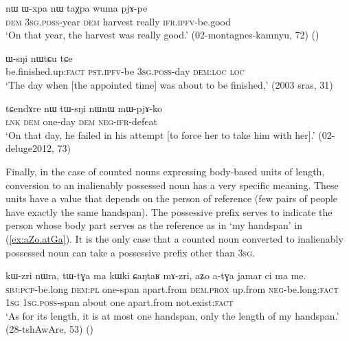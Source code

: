 \begin{exe}
\ex \label{ex:nW.Wxpa.nW}
\gll nɯ ɯ-xpa nɯ taχpa wuma pjɤ-pe \\
\textsc{dem} \textsc{3sg}.\textsc{poss}-year \textsc{dem} harvest really \textsc{ifr}.\textsc{ipfv}-be.good \\
\glt `On that year, the harvest was really good.' (02-montagnes-kamnyu, 72)
()
\end{exe}

\begin{exe}
\ex \label{ex:arCo.pWNu.WsNi}
\gll [arɕo pɯ-ŋu] ɯ-sŋi nɯtɕu tɕe \\
be.finished.up:\textsc{fact} \textsc{pst}.\textsc{ipfv}-be \textsc{3sg}.\textsc{poss}-day \textsc{dem}:\textsc{loc} \textsc{loc} \\
\glt `The day when [the appointed time] was about to be finished,' (2003 sras, 31)
 \end{exe}
 
\begin{exe}
\ex \label{ex:nW.tWsNi}
\gll tɕendɤre nɯ tɯ-sŋi nɯnɯ mɯ-pjɤ-ko \\
\textsc{lnk} \textsc{dem} one-day \textsc{dem} \textsc{neg}-\textsc{ifr}-defeat \\
\glt `On that day, he failed in his attempt [to force her to take him with her].' (02-deluge2012, 73)
\end{exe}

Finally, in the case of counted nouns expressing body-based units of length, conversion to an inalienably possessed noun has a very specific meaning.  These units have a value that depends on the person of reference (few pairs of people have exactly the same handspan). The possessive prefix serves to indicate the person whose body part serves as the reference as in  `my handspan' in (\ref{ex:aZo.atGa}). It is the only case that a counted noun converted to inalienably possessed noun can take a possessive prefix other than \textsc{3sg}.

\begin{exe}
\ex \label{ex:aZo.atGa}
\gll kɯ-zri nɯra, tɯ-tɣa ma kɯki ɕaŋtaʁ mɤ-zri, aʑo a-tɣa jamar ci ma me. \\
 \textsc{sbj}:\textsc{pcp}-be.long \textsc{dem}:\textsc{pl} one-span apart.from \textsc{dem}.\textsc{prox} up.from \textsc{neg}-be.long:\textsc{fact} \textsc{1sg} \textsc{1sg}.\textsc{poss}-span about one apart.from not.exist:\textsc{fact} \\
\glt `As for its length, it is at most one handspan, only the length of my handspan.' (28-tshAwAre, 53)
()
\end{exe}


